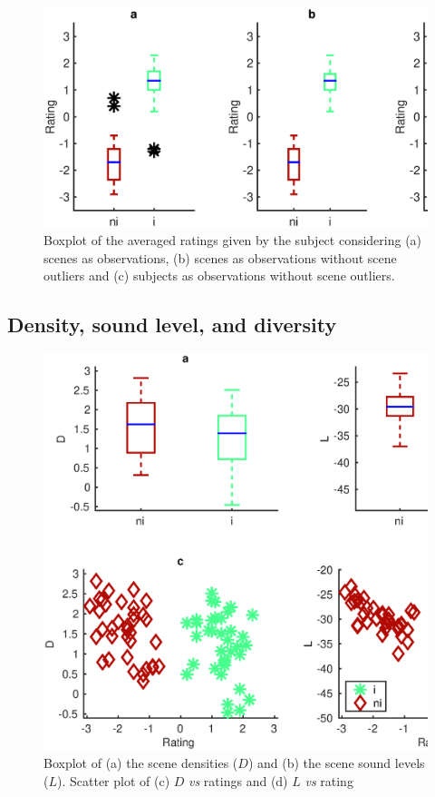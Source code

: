 \documentclass[twoside,twocolumn]{article}
\begin{document}
\begin{figure}[t]
\begin{center}
\includegraphics[width=.4\paperwidth]{../gfxMatlab/xp2_1.eps}
\caption{\label{xp2_1} Boxplot of the averaged ratings given by the subject considering (a) scenes as observations, (b) scenes as observations without scene outliers and (c) subjects as observations without scene outliers.} 
\end{center}
\end{figure}


\subsection{Density, sound level,  and diversity}
\label{sec:levelDensityDiversity}

\begin{figure}[t!]
\centering
\includegraphics[width=.4\paperwidth]{../gfxMatlab/xp1_deSoLv_1.eps} 
\caption{\label{fig:xp1_deSoLv_1}  Boxplot of (a) the scene densities ($D$) and (b) the scene sound levels ($L$). Scatter plot of (c) $D$ \emph{vs} ratings and (d) $L$ \emph{vs} rating}
\end{figure}
\end{document}
